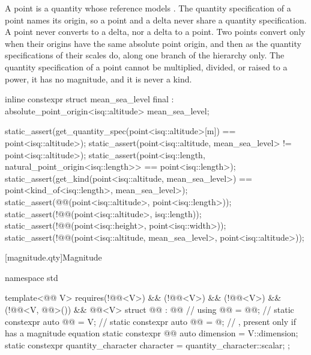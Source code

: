 \pnum
\begin{note}
A point is a quantity whose reference models .
The quantity specification of a point names its origin,
so a point and a delta never share a quantity specification.
A point never converts to a delta, nor a delta to a point.
Two points convert only when their origins have the same absolute point origin,
and then as the quantity specifications of their scales do,
along one branch of the hierarchy only.
The quantity specification of a point cannot be multiplied, divided, or raised to a power,
it has no magnitude,
and it is never a kind.
\end{note}
\begin{example}
\begin{codeblock}
inline constexpr struct mean_sea_level final : absolute_point_origin<isq::altitude> {} mean_sea_level;

static_assert(get_quantity_spec(point<isq::altitude>[m]) == point<isq::altitude>);
static_assert(point<isq::altitude, mean_sea_level> != point<isq::altitude>);
static_assert(point<isq::length, natural_point_origin<isq::length>> == point<isq::length>);
static_assert(get_kind(point<isq::altitude, mean_sea_level>) ==
              point<kind_of<isq::length>, mean_sea_level>);
static_assert(@@(point<isq::altitude>, point<isq::length>));
static_assert(!@@(point<isq::altitude>, isq::length));
static_assert(!@@(point<isq::height>, point<isq::width>));
static_assert(!@@(point<isq::altitude, mean_sea_level>, point<isq::altitude>));
\end{codeblock}
\end{example}

[magnitude.qty]{Magnitude}

\begin{codeblock}
namespace std {

template<@@ V>
  requires(!@@<V>) && (!@@<V>) &&
          (!@@<V>) && (!@@<V, @@>()) &&
          @@<V>
struct @@ : @@ {  // \expos
  using @@ = @@;                    // \expos
  static constexpr auto @@ = V{};          // \expos
  static constexpr auto @@ = @\seebelownc@;            // \expos, present only if  has a magnitude equation
  static constexpr @@ auto dimension = V::dimension;
  static constexpr quantity_character character = quantity_character::scalar;
};

}
\end{codeblock}

